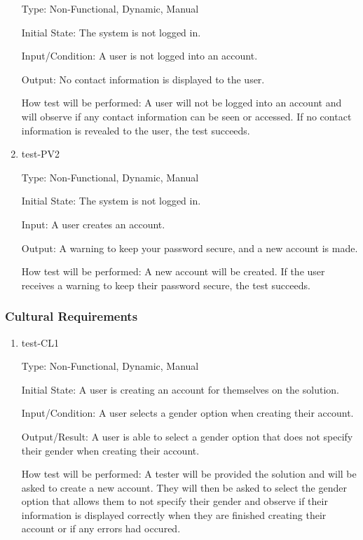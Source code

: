 \documentclass[12pt, titlepage]{article}
\begin{document}
\begin{enumerate}
  Type: Non-Functional, Dynamic, Manual

  Initial State: The system is not logged in.

  Input/Condition: A user is not logged into an account.

  Output: No contact information is displayed to the user.

  How test will be performed: A user will not be logged into an account and will
  observe if any contact information can be seen or accessed. If no contact information
  is revealed to the user, the test succeeds.

  \item{test-PV2\\}

  Type: Non-Functional, Dynamic, Manual

  Initial State: The system is not logged in.

  Input: A user creates an account.

  Output: A warning to keep your password secure, and a new account is made.

  How test will be performed: A new account will be created. If the user 
  receives a warning to keep their password secure, the test succeeds.

\end{enumerate}

\subsubsection{Cultural Requirements}

\begin{enumerate}

  \item{test-CL1\\}

  Type: Non-Functional, Dynamic, Manual

  Initial State: A user is creating an account for themselves on the solution.

  Input/Condition: A user selects a gender option when creating their account.

  Output/Result: A user is able to select a gender option that does not specify their
  gender when creating their account.

  How test will be performed: A tester will be provided the solution and will be asked
  to create a new account. They will then be asked to select the gender option that allows
  them to not specify their gender and observe if their information is displayed correctly
  when they are finished creating their account or if any errors had occured.

\end{enumerate}
\end{document}
